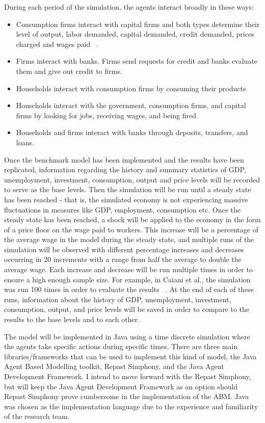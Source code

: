 \documentclass[11pt]{article}
\begin{document}
During each period of the simulation, the agents interact broadly in these ways:
\begin{itemize}
\item Consumption firms interact with capital firms and both types determine their
level of output, labor demanded, capital demanded, credit demanded, prices charged
and wages paid  ~\cite{Caiani-benchmark-paper}.
\item Firms interact with banks. Firms send requests for credit and banks evaluate
them and give out credit to firms.
\item Households interact with consumption firms by consuming their products
\item Households interact with the government, consumption firms, and capital firms
by looking for jobs, receiving wages, and being fired.
\item Households and firms interact with banks through deposits, transfers, and loans.
\end{itemize}
Once the benchmark model has been implemented and the results have been replicated,
information regarding the history and summary statistics of GDP, unemployment,
investment, consumption, output and price levels will be recorded to serve as the
base levels. Then the simulation will be run until a steady state has been reached
 - that is, the simulated economy is not experiencing massive fluctuations in
 measures like GDP, employment, consumption etc. Once the steady state has been
 reached, a shock will be applied to the economy in the form of a price floor on
 the wage paid to workers. This increase will be a percentage of the average wage
 in the model during the steady state, and multiple runs of the simulation will
 be observed with different percentage increases and decreases occurring in 20%
 increments with a range from half the average to double the average wage. Each
 increase and decrease will be run multiple times in order to ensure a high enough
 sample size. For example, in Caiani et al., the simulation was run 100 times in
 order to evaluate the results  ~\cite{Caiani-benchmark-paper}. At the end of each
 of these runs, information about the history of GDP, unemployment, investment,
 consumption, output, and price levels will be saved in order to compare to the
 results to the base levels and to each other.

The model will be implemented in Java using a time discrete simulation where
the agents take specific actions during specific times. There are three main
libraries/frameworks that can be used to implement this kind of model, the Java
Agent Based Modelling toolkit, Repast Simphony, and the Java Agent Development
Framework. I intend to move forward with the Repast Simphony, but will keep the
Java Agent Development Framework as an option should Repast Simphony prove cumbersome
in the implementation of the ABM. Java was chosen as the implementation language
due to the experience and familiarity of the research team.
\end{document}

